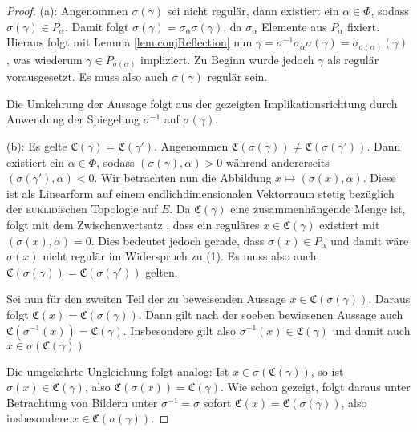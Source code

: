 \begin{proof}
  (a): 
  Angenommen $\sigma(\gamma)$ sei nicht regulär, dann existiert ein $\alpha \in \Phi$, sodass $\sigma(\gamma) \in P_\alpha$.
  Damit folgt $\sigma(\gamma) = \sigma_\alpha \sigma(\gamma)$, da $\sigma_\alpha$ Elemente aus $P_\alpha$ fixiert.
  Hieraus folgt mit Lemma \ref{lem:conjReflection} nun $\gamma = \sigma^{-1} \sigma_\alpha \sigma(\gamma) = \sigma_{\sigma(\alpha)}(\gamma)$, was wiederum $\gamma \in P_{\sigma(\alpha)}$ impliziert.
  Zu Beginn wurde jedoch $\gamma$ als regulär vorausgesetzt.
  Es muss also auch $\sigma(\gamma)$ regulär sein.
  
  Die Umkehrung der Aussage folgt aus der gezeigten Implikationsrichtung durch Anwendung der Spiegelung $\sigma^{-1}$ auf $\sigma(\gamma)$.

  (b): 
  Es gelte $\mathfrak{C}(\gamma) = \mathfrak{C}(\gamma')$.
  Angenommen $\mathfrak{C}(\sigma(\gamma)) \neq \mathfrak{C}(\sigma(\gamma'))$.
  Dann existiert ein $\alpha \in \Phi$, sodass $(\sigma(\gamma), \alpha) > 0$ während andererseits $(\sigma(\gamma'), \alpha) < 0$.
  Wir betrachten nun die Abbildung $x \mapsto  (\sigma(x), \alpha)$.
  Diese ist als Linearform auf einem endlichdimensionalen Vektorraum stetig bezüglich der \textsc{euklid}ischen Topologie auf $E$.
  Da $\mathfrak{C}(\gamma)$ eine zusammenhängende Menge ist, folgt mit dem Zwischenwertsatz \cite[S.232]{bartsch2015allgemeine}, dass ein reguläres $x \in \mathfrak{C}(\gamma)$ existiert mit $(\sigma(x), \alpha) = 0$.
  Dies bedeutet jedoch gerade, dass $\sigma(x) \in P_\alpha$ und damit wäre $\sigma(x)$ nicht regulär im Widerspruch zu (1). Es muss also auch $\mathfrak{C}(\sigma(\gamma)) = \mathfrak{C}(\sigma(\gamma'))$ gelten.
  
  Sei nun für den zweiten Teil der zu beweisenden Aussage $x \in \mathfrak{C}(\sigma(\gamma))$.
  Daraus folgt $\mathfrak{C}(x) = \mathfrak{C}(\sigma(\gamma))$.
  Dann gilt nach der soeben bewiesenen Aussage auch $\mathfrak{C}(\sigma^{-1}(x)) = \mathfrak{C}(\gamma)$.
  Insbesondere gilt also $\sigma^{-1}(x) \in \mathfrak{C}(\gamma)$ und damit auch $x \in \sigma(\mathfrak{C}(\gamma))$
  
  Die umgekehrte Ungleichung folgt analog: Ist $x \in \sigma(\mathfrak{C}(\gamma))$, so ist $\sigma(x) \in \mathfrak{C}(\gamma)$, also $\mathfrak{C}(\sigma(x)) = \mathfrak{C}(\gamma)$. 
  Wie schon gezeigt, folgt daraus unter Betrachtung von Bildern unter $\sigma^{-1} = \sigma$ sofort $\mathfrak{C}(x) = \mathfrak{C}(\sigma(\gamma))$, also insbesondere $x \in \mathfrak{C}(\sigma(\gamma))$.


\end{proof}
